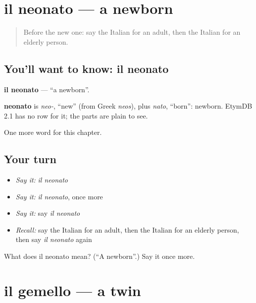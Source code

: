 \section[il neonato]{il neonato — a newborn}

\label{lesson:IT-C224-neonato}



\begin{quote}
Before the new one: say the Italian for an adult, then the Italian for an elderly person.
\end{quote}

\subsection*{You'll want to know: il neonato}
\textbf{il neonato} — \textquotedblleft{}a newborn\textquotedblright{}.

\begin{cousinweb}
\textbf{neonato} is \emph{neo-}, \textquotedblleft{}new\textquotedblright{} (from Greek \emph{neos}), plus \emph{nato}, \textquotedblleft{}born\textquotedblright{}: newborn. EtymDB 2.1 has no row for it; the parts are plain to see.
\end{cousinweb}

\begin{grammarlens}[title={What you've built}]
One more word for this chapter.
\end{grammarlens}

\subsection*{Your turn}
\begin{itemize}
\raggedright
  \item \emph{Say it:} \emph{il neonato}
  \item \emph{Say it:} \emph{il neonato}, once more
  \item \emph{Say it:} say \emph{il neonato}
  \item \emph{Recall:} say the Italian for an adult, then the Italian for an elderly person, then say \emph{il neonato} again
\end{itemize}

\begin{tcolorbox}[breakable,colback=teal!4,colframe=teal!35!black,title={Before you move on}]
What does il neonato mean? (\textquotedblleft{}A newborn\textquotedblright{}.) Say it once more.
\end{tcolorbox}
\section[il gemello]{il gemello — a twin}

